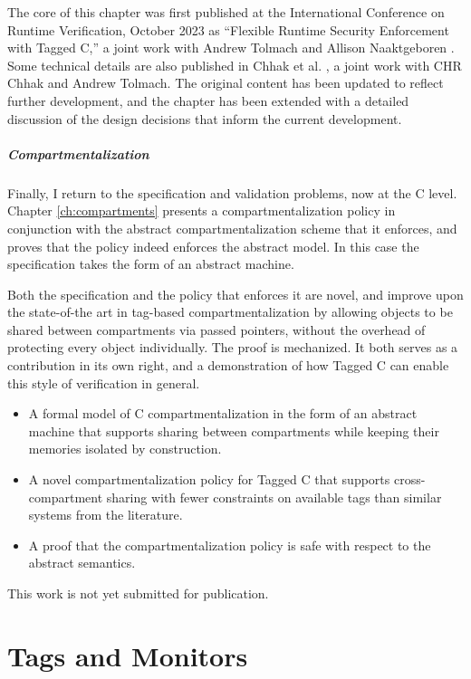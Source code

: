 \documentclass{report}
\begin{document}
The core of this chapter was first published at the International Conference on Runtime Verification,
October 2023 as ``Flexible Runtime Security Enforcement with Tagged C,'' a joint work
with Andrew Tolmach and Allison Naaktgeboren \cite{Anderson23:TaggedC}. Some technical
details are also published in Chhak et al. \cite{}, a joint work with CHR Chhak and Andrew Tolmach.
The original content has been updated to reflect further development, and the chapter has been
extended with a detailed discussion of the design decisions that inform the current development.

\paragraph{Compartmentalization}

Finally, I return to the specification and validation problems, now at the C level. Chapter
\ref{ch:compartments} presents a compartmentalization policy in conjunction with the abstract
compartmentalization scheme that it enforces, and proves that the policy indeed enforces the
abstract model. In this case the specification takes the form of an abstract machine.

Both the specification and the policy that enforces it are novel, and improve upon the
state-of-the art in tag-based compartmentalization by allowing objects to be shared between
compartments via passed pointers, without the overhead of protecting every object individually.
The proof is mechanized. It both serves as a contribution in its own right, and a demonstration
of how Tagged C can enable this style of verification in general. 

\begin{itemize}
\item A formal model of C compartmentalization in the form of an abstract machine that
  supports sharing between compartments while keeping their memories isolated by construction.
\item A novel compartmentalization policy for Tagged C that supports cross-compartment
  sharing with fewer constraints on available tags than similar systems from the literature.
\item A proof that the compartmentalization policy is safe with respect to the abstract semantics.
\end{itemize}

This work is not yet submitted for publication.

\chapter{Tags and Monitors}
\label{ch:background}
\end{document}
